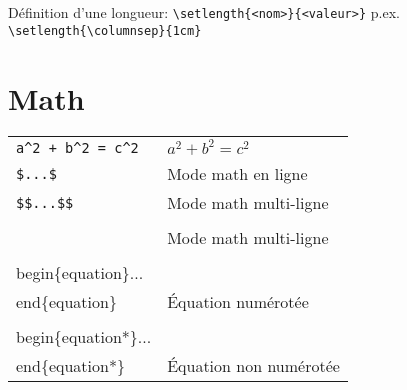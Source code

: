 \documentclass{article}
\let\code\lstinline
\begin{document}
\begin{multicols*}{3}
Définition d'une longueur: \code!\setlength{<nom>}{<valeur>}! p.ex. \\
\code!\setlength{\columnsep}{1cm}!


\section*{Math}

\begin{tabularx}{\columnwidth}{lX}
    \lstinline{a^2 + b^2 = c^2} & $a^2 + b^2 = c^2$     \\
    \lstinline{$...$}           & Mode math en ligne    \\
    \lstinline{$$...$$}         & Mode math multi-ligne \\
    \lstinline{                                         \\[...\\]} & Mode math multi-ligne \\
    \lstinline{\\begin\{equation\}...                   \\end\{equation\}} & Équation numérotée \\
    \lstinline{\\begin\{equation*\}...                  \\end\{equation*\}} & Équation non numérotée \\
\end{tabularx}


\end{multicols*}
\end{document}
